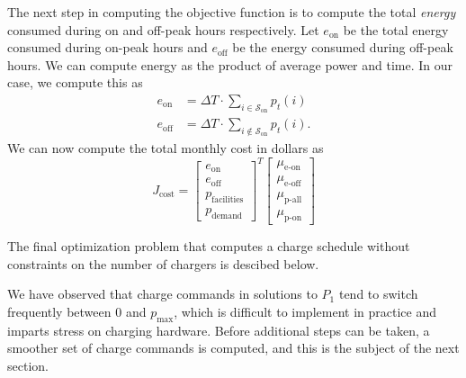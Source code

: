 The next step in computing the objective function is to compute the total {\it energy} consumed during on and off-peak hours respectively.  Let $e_{\text{on}}$ be the total energy consumed during on-peak hours and $e_{\text{off}}$ be the energy consumed during off-peak hours. We can compute energy as the product of average power and time.  In our case, we compute this as 
\begin{equation}\label{eqn:objective:energy}\begin{aligned}
	e_{\text{on}} &= \Delta T\cdot \sum_{i \in \mathcal{S}_{\text{on}}}p_t(i) \\ 
	e_{\text{off}} &= \Delta T\cdot \sum_{i \notin \mathcal{S}_{\text{on}}}p_t(i).  
\end{aligned}\end{equation}
We can now compute the total monthly cost in dollars as
\begin{equation}\label{sec:unconstrainedSchedule:objective}
J_{\text{cost}} = \begin{bmatrix}e_{\text{on}} \\ e_{\text{off}} \\ p_{\text{facilities}} \\ p_{\text{demand}} \end{bmatrix}^T \begin{bmatrix} \mu_{\text{e-on}} \\ \mu_{\text{e-off}} \\ \mu_{\text{p-all}} \\ \mu_{\text{p-on}} \end{bmatrix} 
\end{equation}
\par The final optimization problem that computes a charge schedule without constraints on the number of chargers is descibed below.\\[0.1in]
\par We have observed that charge commands in solutions to $P_1$ tend to switch frequently between $0$ and $p_{\text{max}}$, which is difficult to implement in practice and imparts stress on charging hardware. Before additional steps can be taken, a smoother set of charge commands is computed, and this is the subject of the next section.

